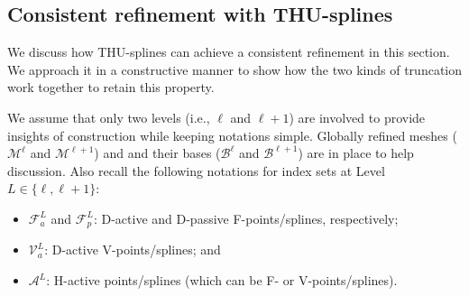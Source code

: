 \documentclass[graybox]{svmult}
\begin{document}
\subsection{Consistent refinement with THU-splines}
We discuss how THU-splines can achieve a consistent refinement in this section. We approach it in a constructive manner to show how the two kinds of truncation work together to retain this property.

We assume that only two levels (i.e., $\ell$ and $\ell+1$) are involved to provide insights of construction while keeping notations simple. Globally refined meshes ($\mathcal{M}^\ell$ and $\mathcal{M}^{\ell+1}$) and and their bases ($\mathcal{B}^\ell$ and $\mathcal{B}^{\ell+1}$) are in place to help discussion. Also recall the following notations for index sets at Level $L\in\{\ell,\ell+1\}$:
\begin{itemize}
\item $\mathcal{F}_a^L$ and $\mathcal{F}_p^L$: D-active and D-passive F-points/splines, respectively;
\item $\mathcal{V}_a^L$: D-active V-points/splines; and
\item $\mathcal{A}^L$: H-active points/splines (which can be F- or V-points/splines).
\end{itemize}
\end{document}
